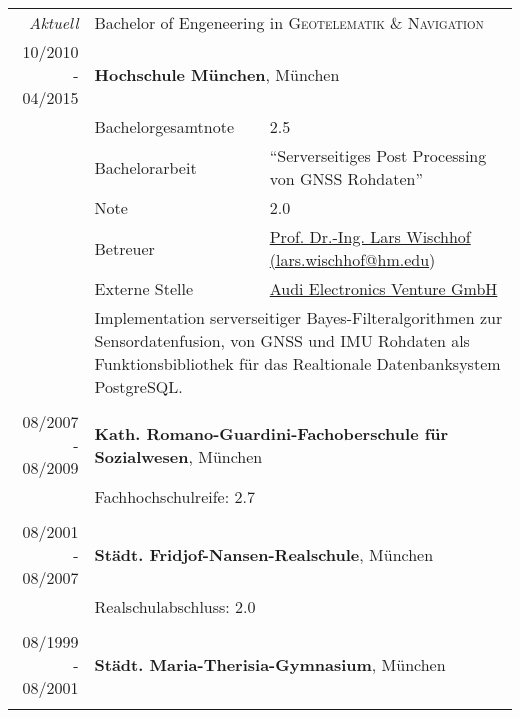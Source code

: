 \documentclass[a4paper,10pt]{article} %
\begin{document}
\begin{tabular}{r|l@{: }p{11cm}}
\emph{Aktuell} & \multicolumn{2}{p{11cm}}{Bachelor of Engeneering in \textsc{Geotelematik \& Navigation}}\\
\textsc{10/2010 - 04/2015} & \multicolumn{2}{p{11cm}}{\textbf{Hochschule München}, München} \\
                           & \small Bachelorgesamtnote & \small  2.5\\
                           & \small Bachelorarbeit & \small ``Serverseitiges Post Processing von GNSS Rohdaten'' \\
                           & \small Note           & \small 2.0\\
			                     & \small Betreuer       & \small \href{mailto:lars.wischhof@hm.edu}{Prof. Dr.-Ing. Lars Wischhof (lars.wischhof@hm.edu}) \\
                           & \small Externe Stelle & \small \href{http://www.audi-electronics-venture.de}{Audi Electronics Venture GmbH} \\
                           & \multicolumn{2}{p{11cm}}{\small Implementation serverseitiger Bayes-Filteralgorithmen zur Sensordatenfusion, von GNSS und IMU Rohdaten als Funktionsbibliothek für das Realtionale Datenbanksystem PostgreSQL.}\\
\multicolumn{3}{c}{}\\
 
 
\textsc{08/2007 - 08/2009} & \multicolumn{2}{p{11cm}}{\textbf{Kath. Romano-Guardini-Fachoberschule für Sozialwesen}, München} \\
                           & \multicolumn{2}{p{11cm}}{\small Fachhochschulreife: 2.7}                                         \\
\multicolumn{3}{c}{}                                                                                \\
 
 
\textsc{08/2001 - 08/2007} & \multicolumn{2}{p{11cm}}{\textbf{Städt. Fridjof-Nansen-Realschule}, München} \\
                           & \multicolumn{2}{p{11cm}}{\small Realschulabschluss: 2.0} \\
\multicolumn{3}{c}{}\\
 
 
\textsc{08/1999 - 08/2001} & \multicolumn{2}{p{11cm}}{\textbf{Städt. Maria-Therisia-Gymnasium}, München} \\
\multicolumn{3}{c}{}\\
\end{tabular}
 
\end{document}

